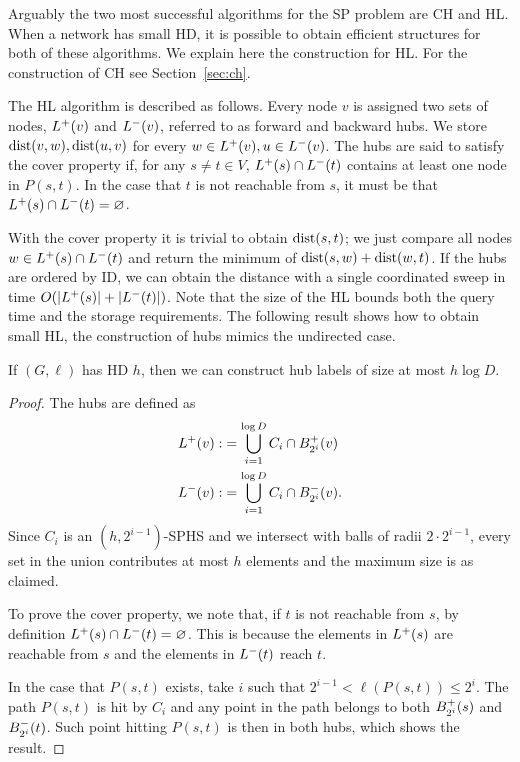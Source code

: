 Arguably the two most successful algorithms for the SP problem are CH and HL.
When a network has small HD, it is possible to obtain efficient structures for both of these algorithms.
We explain here the construction for HL.
For the construction of CH see Section~\ref{sec:ch}.

The HL algorithm is described as follows.
Every node $v$ is assigned two sets of nodes, $L^+(v)$ and $L^-(v)$, referred to as forward and backward hubs.
We store $\text{dist}(v,w),\text{dist}(u,v)$ for every $w\in L^+(v),u\in L^-(v)$.
The hubs are said to satisfy the cover property if, for any $s\neq t\in V$, $L^+(s)\cap L^-(t)$ contains at least one node in $P(s,t)$.
In the case that $t$ is not reachable from $s$, it must be that $L^+(s)\cap L^-(t)=\varnothing$.

With the cover property it is trivial to obtain $\text{dist}(s,t)$; we just compare all nodes $w\in L^+(s)\cap L^-(t)$ and return the minimum of $\text{dist}(s,w)+\text{dist}(w,t)$.
If the hubs are ordered by ID, we can obtain the distance with a single coordinated sweep in time $O(\lvert L^+(s)\rvert+\lvert L^-(t)\rvert)$.
Note that the size of the HL bounds both the query time and the storage requirements.
The following result shows how to obtain small HL, the construction of hubs mimics the undirected case.

\begin{theorem}\label{theo:construct_hl}
If $(G,\ell)$ has HD $h$, then we can construct hub labels of size at most $h\log D$.
\end{theorem}
\begin{proof}
The hubs are defined as
\begin{align*}
L^+(v):&=  \bigcup_{i=1}^{\log D}C_i\cap B^+_{2^i}(v)\\
L^-(v):&= \bigcup_{i=1}^{\log D}C_i\cap B^-_{2^i}(v).
\end{align*}
Since $C_i$ is an $(h,2^{i-1})$-SPHS and we intersect with balls of radii $2\cdot 2^{i-1}$, every set in the union contributes at most $h$ elements and the maximum size is as claimed.

To prove the cover property, we note that, if $t$ is not reachable from $s$, by definition $L^+(s)\cap L^-(t)=\varnothing$.
This is because the elements in $L^+(s)$ are reachable from $s$ and the elements in $L^-(t)$ reach $t$.

In the case that $P(s,t)$ exists, take $i$ such that $2^{i-1}<\ell(P(s,t))\leq 2^i$.
The path $P(s,t)$ is hit by $C_i$ and any point in the path belongs to both $B^+_{2^i}(s)$ and $B^-_{2^i}(t)$.
Such point hitting $P(s,t)$ is then in both hubs, which shows the result.
\end{proof}

